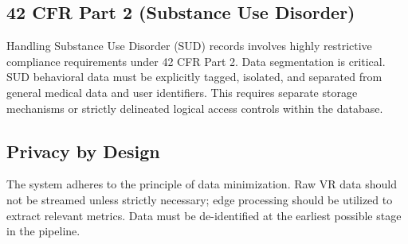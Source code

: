 \documentclass[11pt, letterpaper]{article}
\begin{document}
\subsection{42 CFR Part 2 (Substance Use Disorder)}
Handling Substance Use Disorder (SUD) records involves highly restrictive compliance requirements under 42 CFR Part 2. Data segmentation is critical. SUD behavioral data must be explicitly tagged, isolated, and separated from general medical data and user identifiers. This requires separate storage mechanisms or strictly delineated logical access controls within the database.

\subsection{Privacy by Design}
The system adheres to the principle of data minimization. Raw VR data should not be streamed unless strictly necessary; edge processing should be utilized to extract relevant metrics. Data must be de-identified at the earliest possible stage in the pipeline.
\end{document}
